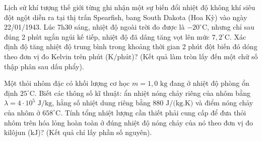 \begin{ex}%
	Lịch sử khí tượng thế giới từng ghi nhận một sự biến đổi nhiệt độ không khí siêu đột ngột diễn ra tại thị trấn Spearfish, bang South Dakota (Hoa Kỳ) vào ngày 22/01/1943. Lúc 7h30 sáng, nhiệt độ ngoài trời đo được là $-20^\circ\text{C}$, nhưng chỉ sau đúng 2 phút ngắn ngủi kế tiếp, nhiệt độ đã dâng tăng vọt lên mức $7,2^\circ\text{C}$. Xác định độ tăng nhiệt độ trung bình trong khoảng thời gian 2 phút đột biến đó dóng theo đơn vị đo Kelvin trên phút ($\text{K/phút}$)? (Kết quả làm tròn lấy đến một chữ số thập phân sau dấu phẩy).
\end{ex}

\begin{ex}%
	Một thỏi nhôm đặc có khối lượng cơ học $m = 1,0\text{ kg}$ đang ở nhiệt độ phòng ổn định $25^\circ\text{C}$. Biết các thông số kĩ thuật: ẩn nhiệt nóng chảy riêng của nhôm bằng $\lambda = 4 \cdot 10^5\text{ J/kg}$, hằng số nhiệt dung riêng bằng $880\text{ J/(kg.K)}$ và điểm nóng chảy của nhôm ở $658^\circ\text{C}$. Tính tổng nhiệt lượng cần thiết phải cung cấp để đưa thỏi nhôm trên hóa lỏng hoàn toàn ở đúng nhiệt độ nóng chảy của nó theo đơn vị đo kilôjun ($\text{kJ}$)? (Kết quả chỉ lấy phần số nguyên).
\end{ex}


